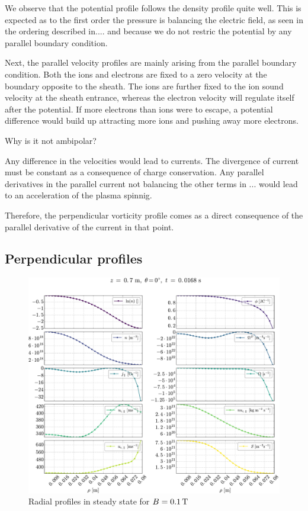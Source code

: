 We observe that the potential profile follows the density profile quite well.
This is expected as to the first order the pressure is balancing the electric field, as seen in the ordering described in....
and because we do not restric the potential by any parallel boundary condition.

Next, the parallel velocity profiles are mainly arising from the parallel boundary condition.
Both the ions and electrons are fixed to a zero velocity at the boundary opposite to the sheath.
The ions are further fixed to the ion sound velocity at the sheath entrance, whereas the electron velocity will regulate itself after the potential.
If more electrons than ions were to escape, a potential difference would build up attracting more ions and pushing away more electrons.

Why is it not ambipolar?

Any difference in the velocities would lead to currents.
The divergence of current must be constant as a consequence of charge conservation.
Any parallel derivatives in the parallel current not balancing the other terms in ...
would lead to an acceleration of the plasma spinnig.

Therefore, the perpendicular vorticity profile comes as a direct consequence of the parallel derivative of the current in that point.

\subsection{Perpendicular profiles}

\begin{figure}[htb]
    \centering
    \includegraphics[width=1.0\textwidth]{fig/results/1DProfiles/B010Rad}
    \caption{Radial profiles in steady state for $B=0.1\, \text{T}$}
    \label{fig:radProfs}
\end{figure}

